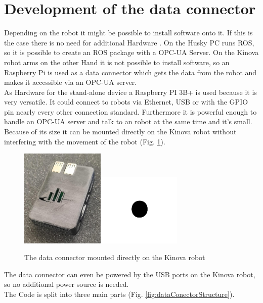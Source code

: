 \documentclass[conference]{IEEEtran}
\begin{document}
\section{Development of the data connector}
Depending on the robot it might be possible to install software onto it.
If this is the case there is no need for additional Hardware .
On the Husky PC runs ROS, so it is possible to create an ROS package with a OPC-UA Server.
On the Kinova robot arms on the other Hand it is not possible to install software, so an Raspberry Pi is used as a data connector which gets the data from the robot and makes it accessible via an OPC-UA server.\\
As Hardware for the stand-alone device a Raspberry PI 3B+ is used because it is very versatile. It could connect to robots via Ethernet, USB or with the GPIO pin nearly every other connection standard.
Furthermore it is powerful enough to handle an OPC-UA server and talk to an robot at the same time and it's small.
Because of its size it can be mounted directly on the Kinova robot without interfering with the movement of the robot (Fig. \ref{fig:dataConectorPic}).
\begin{figure}[htbp]
    \centerline{\includegraphics[width=4cm]{Pictures/PiGehaeuseVorne.jpeg}\includegraphics[width=4cm]{Pictures/fig1.png}}
    \caption{The data connector mounted directly on the Kinova robot}
    \label{fig:dataConectorPic}
\end{figure}
The data connector can even be powered by the USB ports on the Kinova robot, so no additional power source is needed.\\
The Code is split into three main parts (Fig. \ref{fig:dataConectorStructure}).
\end{document}
